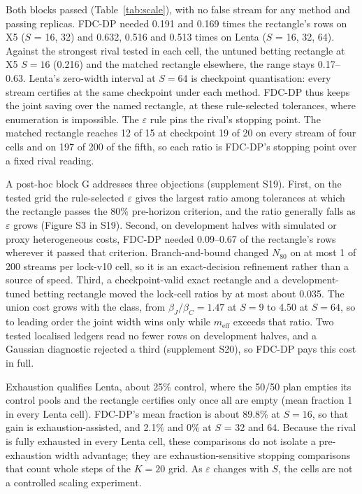\documentclass[sigconf,anonymous,review]{acmart}
\newcommand{\eps}{\varepsilon}
\newcommand{\meff}{m_{\text{eff}}}
\begin{document}
Both blocks passed (Table~\ref{tab:scale}), with no false stream for any method and passing replicas. FDC-DP needed 0.191 and 0.169 times the rectangle's rows on X5 ($S$ = 16, 32) and 0.632, 0.516 and 0.513 times on Lenta ($S$ = 16, 32, 64). Against the strongest rival tested in each cell, the untuned betting rectangle at X5 $S = 16$ (0.216) and the matched rectangle elsewhere, the range stays 0.17--0.63. Lenta's zero-width interval at $S = 64$ is checkpoint quantisation: every stream certifies at the same checkpoint under each method. FDC-DP thus keeps the joint saving over the named rectangle, at these rule-selected tolerances, where enumeration is impossible. The $\eps$ rule pins the rival's stopping point. The matched rectangle reaches 12 of 15 at checkpoint 19 of 20 on every stream of four cells and on 197 of 200 of the fifth, so each ratio is FDC-DP's stopping point over a fixed rival reading.

A post-hoc block G addresses three objections (supplement S19). First, on the tested grid the rule-selected $\eps$ gives the largest ratio among tolerances at which the rectangle passes the 80\% pre-horizon criterion, and the ratio generally falls as $\eps$ grows (Figure S3 in S19). Second, on development halves with simulated or proxy heterogeneous costs, FDC-DP needed 0.09--0.67 of the rectangle's rows wherever it passed that criterion. Branch-and-bound changed $N_{80}$ on at most 1 of 200 streams per lock-v10 cell, so it is an exact-decision refinement rather than a source of speed. Third, a checkpoint-valid exact rectangle and a development-tuned betting rectangle moved the lock-cell ratios by at most about 0.035. The union cost grows with the class, from $\beta_J/\beta_C = 1.47$ at $S = 9$ to 4.50 at $S = 64$, so to leading order the joint width wins only while $\meff$ exceeds that ratio. Two tested localised ledgers read no fewer rows on development halves, and a Gaussian diagnostic rejected a third (supplement S20), so FDC-DP pays this cost in full.

Exhaustion qualifies Lenta, about 25\% control, where the 50/50 plan empties its control pools and the rectangle certifies only once all are empty (mean fraction 1 in every Lenta cell). FDC-DP's mean fraction is about 89.8\% at $S = 16$, so that gain is exhaustion-assisted, and 2.1\% and 0\% at $S$ = 32 and 64. Because the rival is fully exhausted in every Lenta cell, these comparisons do not isolate a pre-exhaustion width advantage; they are exhaustion-sensitive stopping comparisons that count whole steps of the $K = 20$ grid. As $\eps$ changes with $S$, the cells are not a controlled scaling experiment.
\end{document}
